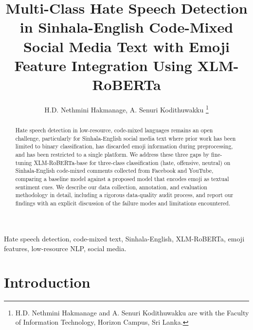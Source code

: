 \documentclass[journal]{IEEEtran}
\begin{document}
\title{Multi-Class Hate Speech Detection in Sinhala-English Code-Mixed
Social Media Text with Emoji Feature Integration Using XLM-RoBERTa}

\author{H.D. Nethmini Hakmanage, A. Senuri Kodithuwakku
\thanks{H.D. Nethmini Hakmanage and A. Senuri Kodithuwakku are with the
Faculty of Information Technology, Horizon Campus, Sri Lanka.}}


\maketitle

\begin{abstract}
Hate speech detection in low-resource, code-mixed languages remains an
open challenge, particularly for Sinhala-English social media text where
prior work has been limited to binary classification, has discarded
emoji information during preprocessing, and has been restricted to a
single platform. We address these three gaps by fine-tuning
XLM-RoBERTa-base for three-class classification (hate, offensive,
neutral) on Sinhala-English code-mixed comments collected from Facebook
and YouTube, comparing a baseline model against a proposed model that
encodes emoji as textual sentiment cues. %
We describe our data collection, annotation, and evaluation methodology
in detail, including a rigorous data-quality audit process, and report
our findings with an explicit discussion of the failure modes and
limitations encountered.
\end{abstract}

\begin{IEEEkeywords}
Hate speech detection, code-mixed text, Sinhala-English, XLM-RoBERTa,
emoji features, low-resource NLP, social media.
\end{IEEEkeywords}

\section{Introduction}
\end{document}
